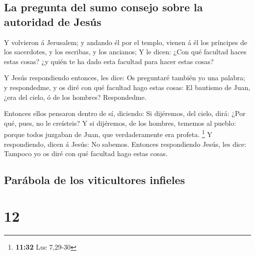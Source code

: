 \hypertarget{la-pregunta-del-sumo-consejo-sobre-la-autoridad-de-jesuxfas}{%
\subsection{La pregunta del sumo consejo sobre la autoridad de
Jesús}\label{la-pregunta-del-sumo-consejo-sobre-la-autoridad-de-jesuxfas}}

 Y volvieron á Jerusalem; y andando él por el templo,
vienen á él los príncipes de los sacerdotes, y los escribas, y los
ancianos;  Y le dicen: ¿Con qué facultad haces estas
cosas? ¿y quién te ha dado esta facultad para hacer estas cosas?

 Y Jesús respondiendo entonces, les dice: Os preguntaré
también yo una palabra; y respondedme, y os diré con qué facultad hago
estas cosas:  El bautismo de Juan, ¿era del cielo, ó de
los hombres? Respondedme.

 Entonces ellos pensaron dentro de sí, diciendo: Si
dijéremos, del cielo, dirá: ¿Por qué, pues, no le creísteis?
 Y si dijéremos, de los hombres, tememos al pueblo:
porque todos juzgaban de Juan, que verdaderamente era profeta.
\footnote{\textbf{11:32} Luc 7,29-30}  Y respondiendo,
dicen á Jesús: No sabemos. Entonces respondiendo Jesús, les dice:
Tampoco yo os diré con qué facultad hago estas cosas.

\hypertarget{paruxe1bola-de-los-viticultores-infieles}{%
\subsection{Parábola de los viticultores
infieles}\label{paruxe1bola-de-los-viticultores-infieles}}

\hypertarget{section-11}{%
\section{12}\label{section-11}}

